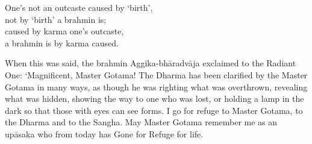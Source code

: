 \begin{MyDescription}{}
One's not an outcaste caused by `birth',\\
not by `birth' a brahmin is;\\
caused by karma one's outcaste,\\
a brahmin is by karma caused.
\end{MyDescription}    

   
   
   
When this was said, the brahmin Aggika-bh\=aradv\=aja exclaimed to the Radiant One: `Magnificent, Master Gotama! The Dharma has been clarified by the Master Gotama in many ways, as though he was righting what was overthrown, revealing what was hidden, showing the way to one who was lost, or holding a lamp in the dark so that those with eyes can see forms. I go for refuge to Master Gotama, to the Dharma and to the Sangha. May Master Gotama remember me as an up\=asaka who from today has Gone for Refuge for life.

\begin{MyDescription}[(Sn. 116-142)]{}
\end{MyDescription}     							
\newpage   							

